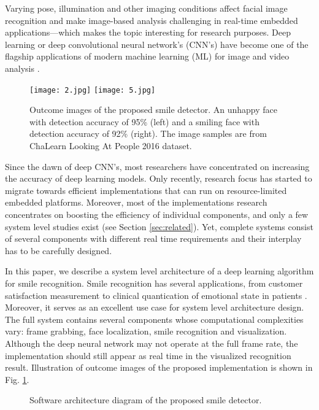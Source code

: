 \documentclass[conference]{IEEEtran}
\begin{document}
 Varying pose, illumination and other imaging conditions affect facial image recognition and make image-based analysis challenging in real-time embedded applications---which makes the topic interesting for research purposes. Deep learning or deep convolutional neural network’s (CNN’s) have become one of the flagship applications of modern machine learning (ML) for image and video analysis \cite{a5}.

 \begin{figure}[t]
\centering
\texttt{[image: 2.jpg]}
\texttt{[image: 5.jpg]}
\caption{Outcome images of the proposed smile detector. An unhappy face with detection accuracy of 95\% (left) and a smiling face with detection accuracy of 92\% (right). The image samples are from ChaLearn Looking At People 2016 dataset.}\label{fig:image1}
\end{figure}

 Since the dawn of deep CNN’s, most researchers have concentrated on increasing the accuracy of deep learning models. Only recently, research focus has started to migrate towards efficient implementations \cite{mobilenets,squeeze} that can run on resource-limited embedded platforms. Moreover, most of the implementations research concentrates on boosting the efficiency of individual components, and only a few system level studies exist (see Section \ref{sec:related}). Yet, complete systems consist of several components with different real time requirements and their interplay has to be carefully designed.

 In this paper, we describe a system level architecture of a deep learning algorithm for smile recognition. Smile recognition has several applications, from customer satisfaction measurement \cite{product} to clinical quantication of emotional state in patients \cite{tur2018}. Moreover, it serves as an excellent use case for system level architecture design. The full system contains several components whose computational complexities vary: frame grabbing, face localization, smile recognition and visualization. Although the deep neural network may not operate at the full frame rate, the implementation should still appear as real time in the visualized recognition result. Illustration of outcome images of the proposed implementation is shown in Fig. \ref{fig:image1}.

\begin{figure*}[!b]
\vspace{1mm}
\caption{Software architecture diagram of the proposed smile detector.}\label{fig:diagram}
\end{figure*}
\end{document}

